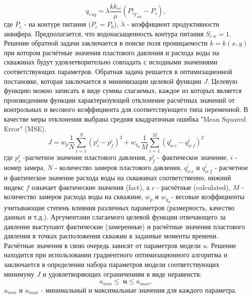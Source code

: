 \documentclass{article}
\begin{document}
\begin{equation*} \label{qaq}
q_{i\:aq} = \lambda \frac{kk_{ri}}{\mu}(P|_{\Gamma_{out}}-P_c),
\end{equation*}
где $P_{c}$ - на контуре питания ($P_c = P_0$), $\lambda$ - коэффициент продуктивности аквифера. Предполагается, что водонасыщенность контура питания $S_{c\:w} = 1$.
Решение обратной задачи заключается в поиске поля проницаемости $k = k(x,y)$ при котором расчётные значения пластового давления и расхода воды на скважинах будут удовлетворительно совпадать с исходными значениями соответствующих параметров. Обратная задача решается в оптимизационной постановке, которая заключается в минимизации целевой функции $J$. Целевую функцию можно записать в виде суммы слагаемых, каждое из которых является произведением функции характеризующей отклонение расчётных значений от контрольных и весового коэффициента для соответствующего типа переменной. В качестве меры отклонения выбрана средняя квадратичная ошибка "Mean Squared Error" (MSE). 
\begin{equation} \label{mse}
	J=w_p\frac{1}{N}\sum_{i=1}^N{\left(p_c^i-p_f^i\right)^2}+w_{q_w}\frac{1}{M}\sum_{i=1}^M{\left(q_{w\:c}^i-q_{w\:f}^i\right)^2}
\end{equation}
где $p_c^i$ -расчетное значение пластового давления, $p_f^i$ - фактическое значение, $i$ - номер замера, $N$ - количество замеров пластового давления, $q_{w\:c}^i$ и $q_{w\:f}^i$ - расчетное и фактическое значение расхода воды на скважинах соответственно, нижний индекс $f$ означает фактические значения (fact), а $c$ - расчётные (calculated), $M$ - количество замеров расхода воды на скважине, $w_p$ и $w_{q_w}$- весовые коэффициенты учитывающие степень влияния различных параметров (размерность, качество данных и т.д.). Аргументами слагаемого целевой функции отвечающего за давление выступают фактические (замеренные) и расчётные значения пластового давления в точках расположения скважин в заданные моменты времени.  
 Расчётные значения в свою очередь зависят от параметров модели $u$. Решение находится при использовании градиентного оптимизационного алгоритма и заключается в определении набора параметров модели соответствующих минимуму $J$ и удовлетворяющих ограничениям в виде неравенств:
\begin{equation*}
u_{min}\leq\ \boldsymbol{u}\leq u_{max},
\end{equation*}
$u_{min}$ и $u_{max}$ - минимальный и максимальные значения для каждого параметра.
\end{document}

